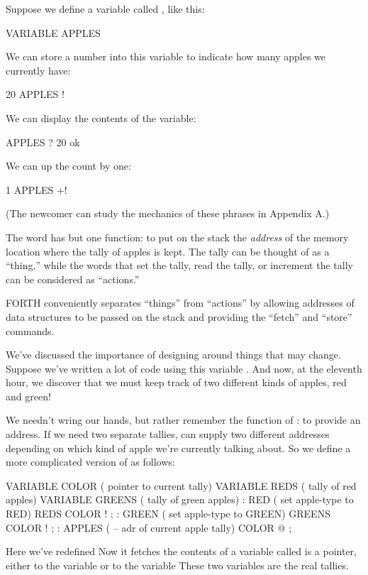 Suppose we define a variable called , like this:
\begin{Code}
VARIABLE APPLES
\end{Code}
We can store a number into this variable to indicate how many apples
we currently have:
\begin{Code}
20 APPLES !
\end{Code}
We can display the contents of the variable:
\begin{Code}
APPLES ? 20 ok
\end{Code}
We can up the count by one:
\begin{Code}
1 APPLES +!
\end{Code}
(The newcomer can study the mechanics of these phrases in Appendix A.)

The word  has but one function: to put on the stack the
\emph{address} of the memory location where the tally of apples is
kept. The tally can be thought of as a ``thing,'' while the words that
set the tally, read the tally, or increment the tally can be
considered as ``actions.''

FORTH conveniently separates ``things'' from ``actions'' by allowing
addresses of data structures to be passed on the stack and providing
the ``fetch'' and ``store'' commands.

We've discussed the importance of designing around things that may
change. Suppose we've written a lot of code using this variable
.  And now, at the eleventh hour, we discover that we
must keep track of two different kinds of apples, red and green!

We needn't wring our hands, but rather remember the function of
: to provide an address. If we need two separate
tallies,  can supply two different addresses depending
on which kind of apple we're currently talking about. So we define a
more complicated version of
 as follows:

\begin{Code}
VARIABLE COLOR  ( pointer to current tally)
VARIABLE REDS  ( tally of red apples)
VARIABLE GREENS  ( tally of green apples)
: RED  ( set apple-type to RED)  REDS COLOR ! ;
: GREEN  ( set apple-type to GREEN)  GREENS COLOR ! ;
: APPLES  (  -- adr of current apple tally)  COLOR @ ;
\end{Code}


Here we've redefined  Now it fetches the contents of a
variable called   is a pointer, either to
the variable  or to the variable  These two
variables are the real tallies.

